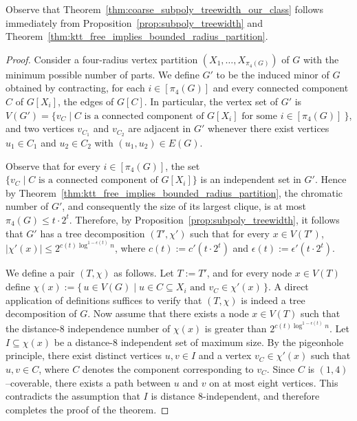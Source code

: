 Observe that Theorem~\ref{thm:coarse_subpoly_treewidth_our_class} follows immediately from Proposition~\ref{prop:subpoly_treewidth} and Theorem~\ref{thm:ktt_free_implies_bounded_radius_partition}.

\CoarseSubpolyTreewidthOurClass*
\begin{proof}
    Consider a four-radius vertex partition $(X_1,\dots,X_{\pi_4(G)})$ of $G$ with the minimum possible number of parts. We define $G'$ to be the induced minor of $G$ obtained by contracting, for each $i \in [\pi_4(G)]$ and every connected component $C$ of $G[X_i]$, the edges of $G[C]$. In particular, the vertex set of $G'$ is $V(G') = \{ v_{C} \mid C \text{ is a connected component of } G[X_i] \text{ for some } i \in [\pi_4(G)]\ \}$, and two vertices $v_{C_1}$ and $v_{C_2}$ are adjacent in $G'$ whenever there exist vertices $u_1 \in C_1$ and $u_2 \in C_2$ with $(u_1,u_2) \in E(G)$. 
    
    Observe that for every $i\in[\pi_4(G)]$, the set $\{ v_{C}\mid C \text{ is a connected component of } G[X_i]\}$ is an independent set in $G'$. Hence by Theorem~\ref{thm:ktt_free_implies_bounded_radius_partition}, the chromatic number of $G'$, and consequently the size of its largest clique, is at most $\pi_4(G) \leq t \cdot 2^{t}$. Therefore, by Proposition~\ref{prop:subpoly_treewidth}, it follows that $G'$ has a tree decomposition $(T',\chi')$ such that for every $x\in V(T')$, $|\chi'(x)|\leq 2^{c(t) \log^{1-\epsilon(t)} n}$, where $c(t) := c'(t \cdot 2^{t})$ and $\epsilon(t) := \epsilon'(t \cdot 2^{t})$. 
    
    We define a pair $(T,\chi)$ as follows. Let $T := T'$, and for every node $x \in V(T)$ define $\chi(x) := \{\, u \in V(G) \mid \text{$u \in C \subseteq X_i$ and $v_{C} \in \chi'(x)$} \,\}$. A direct application of definitions suffices to verify that $(T,\chi)$ is indeed a tree decomposition of $G$.
    Now assume that there exists a node $x \in V(T)$ such that the distance-$8$ independence number of $\chi(x)$ is greater than $2^{c(t)\log^{1-\epsilon(t)} n}$. Let $I \subseteq \chi(x)$ be a distance-$8$ independent set of maximum size. By the pigeonhole principle, there exist distinct vertices $u,v \in I$ and a vertex $v_C \in \chi'(x)$ such that $u,v \in C$, where $C$ denotes the component corresponding to $v_C$. Since $C$ is $(1,4)$--coverable, there exists a path between $u$ and $v$ on at most eight vertices. This contradicts the assumption that $I$ is distance $8$-independent, and therefore completes the proof of the theorem.
\end{proof}

